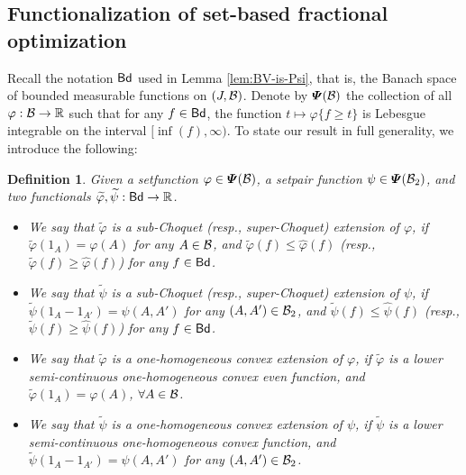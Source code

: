 \documentclass[12pt,a4paper]{article}
\newtheorem{defn}[theorem]{Definition}
\begin{document}
\subsection{Functionalization of set-based fractional optimization}
Recall the notation ${\sf Bd}$ used in Lemma \ref{lem:BV-is-Psi}, that is, the Banach space of bounded measurable functions on $(J,\mathcal{B})$. 
Denote by $\bm{\varPsi}(\mathcal{B})$ the collection of all $\varphi:\mathcal{B}\to\mathbb{R}$ such that for any  $f\in{\sf Bd}$, the function $t\mapsto \varphi\{f\ge t\}$ is Lebesgue integrable on the interval $[\inf (f),\infty)$. 
To state our result in full generality, we introduce the following:
\begin{defn}
Given  a setfunction $\varphi\in\bm{\varPsi}(\mathcal{B})$, a setpair function $\psi\in\bm{\varPsi}(\mathcal{B}_2)$, and two functionals $\widetilde{\varphi},\widetilde{\psi}:{\sf Bd}\to\mathbb{R}$.
\begin{itemize}
\item[\textbf{C1}] We say that $\widetilde{\varphi}$ is a sub-Choquet (resp., super-Choquet) extension of $\varphi$, if $\widetilde{\varphi}(1_A)=\varphi(A)$ for any $A\in\mathcal{B}$, and $\widetilde{\varphi}(f)\le \widehat{\varphi}(f)$ (resp., $\widetilde{\varphi}(f)\ge \widehat{\varphi}(f)$) for any $f\in{\sf Bd}$.
\item[\textbf{C2}] We say that $\widetilde{\psi}$ is a sub-Choquet (resp., super-Choquet) extension of $\psi$, if $\widetilde{\psi}(1_A-1_{A'})=\psi(A,A')$ for any $(A,A')\in\mathcal{B}_2$, and $\widetilde{\psi}(f)\le \widehat{\psi}(f)$ (resp., $\widetilde{\psi}(f)\ge \widehat{\psi}(f)$) for any $f\in{\sf Bd}$.
\item[\textbf{C3}] 
We say that $\widetilde{\varphi}$ is a \emph{one-homogeneous convex extension} of $\varphi$,  if $\widetilde{\varphi}$ is a lower semi-continuous  one-homogeneous convex even function, and  $\widetilde{\varphi}(1_A)=\varphi(A)$, $\forall A\in\mathcal{B}$. 
\item[\textbf{C4}] 
We say that $\widetilde{\psi}$ is a \emph{one-homogeneous convex extension} of $\psi$,  if $\widetilde{\psi}$ is a lower semi-continuous  one-homogeneous convex function, and  $\widetilde{\psi}(1_A-1_{A'})=\psi(A,A')$  for any $(A,A')\in\mathcal{B}_2$. 
\end{itemize}    
\end{defn}
\end{document}
